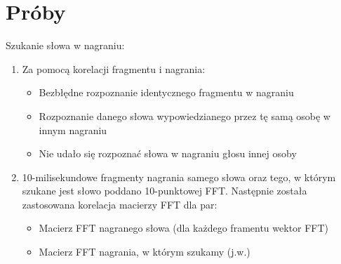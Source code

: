 \section{Próby}
Szukanie słowa w nagraniu:
\\
\begin{enumerate}
\item 
{
	Za pomocą korelacji fragmentu i nagrania:
	\begin{itemize}
		\item Bezbłędne rozpoznanie identycznego fragmentu w nagraniu
		\item Rozpoznanie danego słowa wypowiedzianego przez tę samą osobę w innym nagraniu
		\item Nie udało się rozpoznać słowa w nagraniu głosu innej osoby
	\end{itemize}
}

\item
{
	10-milisekundowe fragmenty nagrania samego słowa oraz tego, w którym szukane jest słowo poddano 10-punktowej FFT. Następnie została zastosowana korelacja macierzy FFT dla par: 
	\begin{itemize}
		\item Macierz FFT nagranego słowa (dla każdego framentu wektor FFT)
		\item Macierz FFT nagrania, w którym szukamy (j.w.)
	\end{itemize}
}
\end{enumerate}